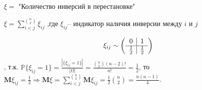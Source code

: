 \begin{example}
  
  $\xi = $ "Количество инверсий в перестановке"

  $\xi = \sum\limits_{i < j}^{\binom{n}{2}}\xi_{ij}$ ,где $\xi_{ij}$-- индикатор наличия инверсии между $i$ и $j$

  \[ \xi_{ij} \sim \left( \begin{array}{cc}
    0 & \multicolumn{1}{|c}{1}\\ \hline
    \frac{1}{2} & \multicolumn{1}{|c}{\frac{1}{2}}\\
  \end{array} \right) \], т.к.
  $\mathbb{P}\{\xi_{ij} = 1\} = \frac{|\{\xi_{ij} = 1\}|}{|\Omega|} = \frac{\binom{n}{2}(n-2)!}{n!} = \frac{1}{2}$, то
  $\mathbf{M}\xi_{ij} = \frac{1}{2} \Rightarrow \mathbf{M}\xi = \sum\limits_{i < j}^{\binom{n}{2}}\mathbf{M}\xi_{ij} = \frac{1}{2}\binom{n}{2} = \frac{n(n-1)}{4}$.

\end{example}
